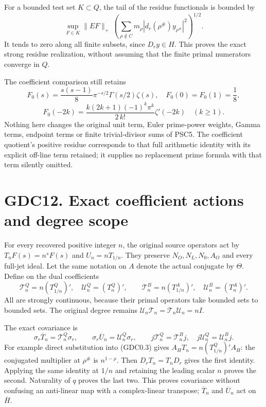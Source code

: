 For a bounded test set \(K\subset Q\), the tail of the residue
functionals is bounded by \[
\sup_{F\in K}\|EF\|_+\,
\left(\sum_{\rho\notin C}m_\rho
|d_r(\rho^\#)y_{\rho^\#}|^2\right)^{1/2}.
\tag{GDC11.4}
\] It tends to zero along all finite subsets, since \(D_ry\in H\). This
proves the exact strong residue realization, without assuming that the
finite primal numerators converge in \(Q\).

The coefficient comparison still retains \[
F_0(s)=\frac{s(s-1)}8\pi^{-s/2}\Gamma(s/2)\zeta(s),
\quad F_0(0)=F_0(1)=\frac18,
\] \[
F_0(-2k)=\frac{k(2k+1)(-1)^k\pi^k}{2\,k!}\zeta'(-2k)
\quad(k\ge1).
\tag{GDC11.5}
\] Nothing here changes the original unit term, Euler prime-power
weights, Gamma terms, endpoint terms or finite trivial-divisor sums of
PSC5. The coefficient quotient's positive residue corresponds to that
full arithmetic identity with its explicit off-line term retained; it
supplies no replacement prime formula with that term silently omitted.

\section{GDC12. Exact coefficient actions and degree
scope}\label{gdc12.-exact-coefficient-actions-and-degree-scope}

For every recovered positive integer \(n\), the original source
operators act by \(T_nF(s)=n^sF(s)\) and \(U_n=nT_{1/n}\). They preserve
\(N_O,N_L,N_0,A_O\) and every full-jet ideal. Let the same notation on
\(A\) denote the actual conjugate by \(\Theta\). Define on the dual
coefficients \[
\mathcal T_n^Q=n(T_{1/n}^Q)',\quad
\mathcal U_n^Q=(T_n^Q)',\qquad
\mathcal T_n^B=n(T_{1/n}^A)',\quad
\mathcal U_n^B=(T_n^A)'.
\tag{GDC12.1}
\] All are strongly continuous, because their primal operators take
bounded sets to bounded sets. The original degree remains
\(\mathcal U_n\mathcal T_n=\mathcal T_n\mathcal U_n=nI\).

The exact covariance is \[
\sigma_r\overline T_n=\mathcal T_n^Q\sigma_r,
\qquad \sigma_r\overline U_n=\mathcal U_n^Q\sigma_r,
\qquad j\mathcal T_n^Q=\mathcal T_n^B j,
\quad j\mathcal U_n^Q=\mathcal U_n^B j.
\tag{GDC12.2}
\] For example direct substitution into (GDC0.3) gives
\(A_HT_n=n(T_{1/n}^Q)'A_H\): the conjugated multiplier at \(\rho^\#\) is
\(n^{1-\rho}\). Then \(D_rT_n=T_nD_r\) gives the first identity.
Applying the same identity at \(1/n\) and retaining the leading scalar
\(n\) proves the second. Naturality of \(q\) proves the last two. This
proves covariance without confusing an anti-linear map with a
complex-linear transpose; \(\overline T_n\) and \(\overline U_n\) act on
\(\overline H\).

